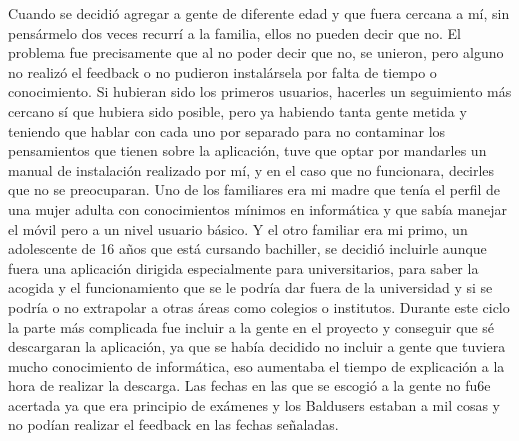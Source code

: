 Cuando se decidió agregar a gente de diferente edad y que fuera cercana a mí, sin pensármelo dos veces recurrí a la familia, ellos no pueden decir que no.
El problema fue precisamente que al no poder decir que no, se unieron,  pero alguno no realizó el feedback o no pudieron instalársela por falta de tiempo o conocimiento.
Si hubieran sido los primeros usuarios, hacerles un seguimiento más cercano sí que hubiera sido posible, pero ya habiendo tanta gente metida y teniendo que hablar con cada uno por separado para no contaminar los pensamientos que tienen sobre la aplicación, tuve que optar por mandarles un manual de instalación realizado por mí, y en el caso que no funcionara, decirles que no se preocuparan.
Uno de los familiares era mi madre que tenía el perfil de una mujer adulta con conocimientos mínimos en informática y que sabía manejar el móvil pero a un nivel usuario básico.
Y el otro familiar era mi primo, un adolescente de 16 años que está cursando bachiller, se decidió incluirle aunque fuera una aplicación dirigida especialmente para universitarios, para saber la acogida y el funcionamiento que se le podría dar fuera de la universidad y si se podría o no extrapolar a otras áreas como colegios o institutos.
Durante este ciclo la parte más complicada fue incluir a la gente en el proyecto y conseguir que sé descargaran la aplicación, ya que se había decidido no incluir a gente que tuviera mucho conocimiento de informática, eso aumentaba el tiempo de explicación a la hora de realizar la descarga.
Las fechas en las que se escogió a la gente no fu6e acertada ya que era principio de exámenes y los Baldusers estaban a mil cosas y no podían realizar el feedback en las fechas señaladas.

